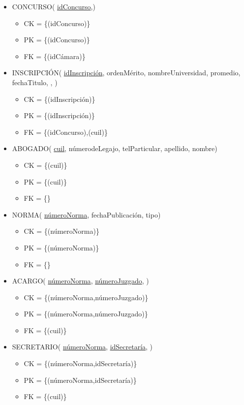 \begin{itemize}
	
\item CONCURSO( \underline{idConcurso},)
	\begin{itemize}
		\item CK = \{(idConcurso)\}
		\item PK = \{(idConcurso)\}
		\item FK = \{(idCámara)\}
	\end{itemize}
	
\item INSCRIPCIÓN( \underline{idInscripción}, ordenMérito, nombreUniversidad, promedio, fechaTitulo, , )
	\begin{itemize}
		\item CK = \{(idInscripción)\}
		\item PK = \{(idInscripción)\}
		\item FK = \{(idConcurso),(cuil)\}
	\end{itemize}
	
\item ABOGADO( \underline{cuil}, númerodeLegajo, telParticular, apellido, nombre)
	\begin{itemize}
		\item CK = \{(cuil)\}
		\item PK = \{(cuil)\}
		\item FK = \{\}
	\end{itemize}
	
\item NORMA( \underline{númeroNorma}, fechaPublicación, tipo)
	\begin{itemize}
		\item CK = \{(númeroNorma)\}
		\item PK = \{(númeroNorma)\}
		\item FK = \{\}
	\end{itemize}
	
\item ACARGO(  \underline{númeroNorma}, \underline{númeroJuzgado}, )
	\begin{itemize}
		\item CK = \{(númeroNorma,númeroJuzgado)\}
		\item PK = \{(númeroNorma,númeroJuzgado)\}
		\item FK = \{(cuil)\}
	\end{itemize}
	
	
\item SECRETARIO( \underline{númeroNorma}, \underline{idSecretaría}, )
	\begin{itemize}
		\item CK = \{(númeroNorma,idSecretaría)\}
		\item PK = \{(númeroNorma,idSecretaría)\}
		\item FK = \{(cuil)\}
	\end{itemize}




\end{itemize}
